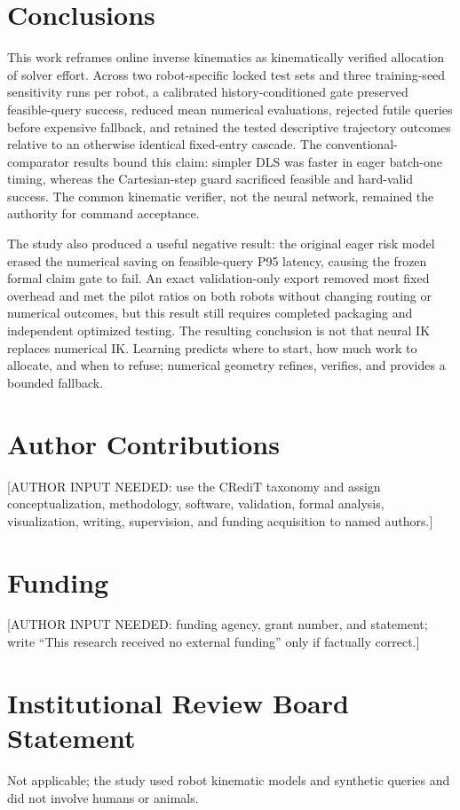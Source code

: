 \documentclass[10pt,a4paper]{article}
\newcommand{\authorinput}[1]{\textcolor{draftred}{[AUTHOR INPUT NEEDED: #1]}}
\begin{document}
\section{Conclusions}

This work reframes online inverse kinematics as kinematically verified allocation of
solver effort. Across two robot-specific locked test sets and three training-seed
sensitivity runs per robot, a calibrated
history-conditioned gate preserved feasible-query success, reduced mean numerical
evaluations, rejected futile queries before expensive fallback, and retained the tested
descriptive trajectory outcomes relative to an otherwise identical fixed-entry
cascade. The conventional-comparator results bound this claim: simpler DLS was faster
in eager batch-one timing, whereas the Cartesian-step guard sacrificed feasible and
hard-valid success. The common kinematic verifier, not the neural network, remained
the authority for command acceptance.

The study also produced a useful negative result: the original eager risk model erased
the numerical saving on feasible-query P95 latency, causing the frozen formal claim
gate to fail. An exact validation-only export removed most fixed overhead and met the
pilot ratios on both robots without changing routing or numerical outcomes, but this
result still requires completed packaging and independent optimized testing. The resulting conclusion is not
that neural IK replaces numerical IK. Learning predicts where to start, how much work
to allocate, and when to refuse; numerical geometry refines, verifies, and provides a
bounded fallback.

\section*{Author Contributions}
\authorinput{use the CRediT taxonomy and assign conceptualization, methodology,
software, validation, formal analysis, visualization, writing, supervision, and
funding acquisition to named authors.}

\section*{Funding}
\authorinput{funding agency, grant number, and statement; write ``This research
received no external funding'' only if factually correct.}

\section*{Institutional Review Board Statement}
Not applicable; the study used robot kinematic models and synthetic queries and did
not involve humans or animals.
\end{document}
